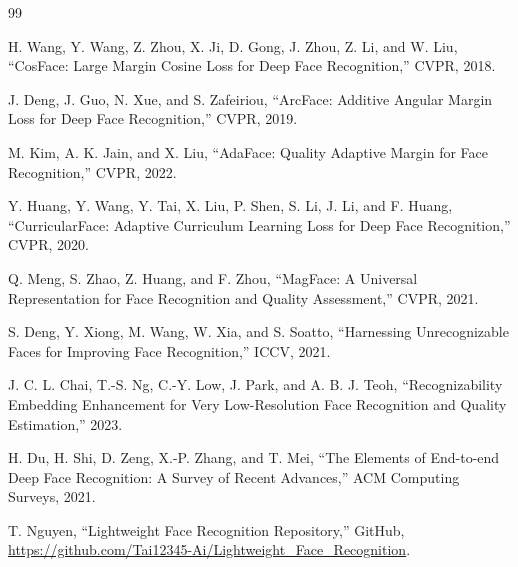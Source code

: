 \documentclass[13pt,a4paper]{extreport}
\newcommand{\repo}{\url{https://github.com/Tai12345-Ai/Lightweight_Face_Recognition}}
\begin{document}
\begin{thebibliography}{99}

H. Wang, Y. Wang, Z. Zhou, X. Ji, D. Gong, J. Zhou, Z. Li, and W. Liu, ``CosFace: Large Margin Cosine Loss for Deep Face Recognition,'' CVPR, 2018.

J. Deng, J. Guo, N. Xue, and S. Zafeiriou, ``ArcFace: Additive Angular Margin Loss for Deep Face Recognition,'' CVPR, 2019.

M. Kim, A. K. Jain, and X. Liu, ``AdaFace: Quality Adaptive Margin for Face Recognition,'' CVPR, 2022.

Y. Huang, Y. Wang, Y. Tai, X. Liu, P. Shen, S. Li, J. Li, and F. Huang, ``CurricularFace: Adaptive Curriculum Learning Loss for Deep Face Recognition,'' CVPR, 2020.

Q. Meng, S. Zhao, Z. Huang, and F. Zhou, ``MagFace: A Universal Representation for Face Recognition and Quality Assessment,'' CVPR, 2021.

S. Deng, Y. Xiong, M. Wang, W. Xia, and S. Soatto, ``Harnessing Unrecognizable Faces for Improving Face Recognition,'' ICCV, 2021.

J. C. L. Chai, T.-S. Ng, C.-Y. Low, J. Park, and A. B. J. Teoh, ``Recognizability Embedding Enhancement for Very Low-Resolution Face Recognition and Quality Estimation,'' 2023.

H. Du, H. Shi, D. Zeng, X.-P. Zhang, and T. Mei, ``The Elements of End-to-end Deep Face Recognition: A Survey of Recent Advances,'' ACM Computing Surveys, 2021.

T. Nguyen, ``Lightweight Face Recognition Repository,'' GitHub, \repo.

\end{thebibliography}
\end{document}
